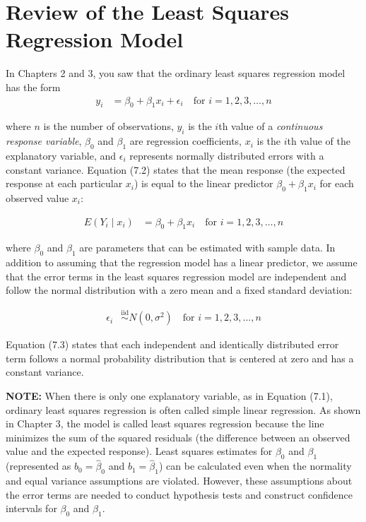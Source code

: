 \documentclass[
]{report}
\begin{document}
\hypertarget{review-of-the-least-squares-regression-model-1}{%
\section{\texorpdfstring{\textbf{Review of the Least Squares Regression Model}}{Review of the Least Squares Regression Model}}\label{review-of-the-least-squares-regression-model-1}}

In Chapters 2 and 3, you saw that the ordinary least squares regression model has the form
\begin{align}
y_i &= \beta_0 + \beta_1 x_i + \epsilon_i
\quad\text{for } i = 1, 2, 3, \dots, n
\tag{7.1}
\end{align}

where \(n\) is the number of observations, \(y_i\) is the \(i\)th value of a \textit{continuous response variable}, \(\beta_0\) and \(\beta_1\) are regression coefficients, \(x_i\) is the \(i\)th value of the explanatory variable, and \(\epsilon_i\) represents normally distributed errors with a constant variance. Equation (7.2) states that the mean response (the expected response at each particular \(x_i\)) is equal to the linear predictor \(\beta_0 + \beta_1 x_i\) for each observed value \(x_i\):

\begin{align}
E(Y_i \mid x_i) &= \beta_0 + \beta_1 x_i 
\quad\text{for } i = 1, 2, 3, \dots, n
\tag{7.2}
\end{align}

where \(\beta_0\) and \(\beta_1\) are parameters that can be estimated with sample data. In addition to assuming that the regression model has a linear predictor, we assume that the error terms in the least squares regression model are independent and follow the normal distribution with a zero mean and a fixed standard deviation:

\begin{align}
\epsilon_i &\overset{\mathrm{iid}}{\sim} N(0, \sigma^2) 
\quad\text{for } i = 1, 2, 3, \dots, n
\tag{7.3}
\end{align}

Equation (7.3) states that each independent and identically distributed error term follows a normal probability
distribution that is centered at zero and has a constant variance.

\large

\textbf{NOTE:}
When there is only one explanatory variable, as in Equation (7.1), ordinary least squares regression is often called simple linear regression. As shown in Chapter 3, the model is called least squares regression because the line minimizes the sum of the squared residuals (the difference between an observed value and the expected response). Least squares estimates for \(\beta_0\) and \(\beta_1\) (represented as \(b_0 = \hat\beta_0\) and \(b_1 = \hat\beta_1\)) can be calculated even when the normality and equal variance assumptions are violated. However, these assumptions about the error terms are needed to conduct hypothesis tests and construct confidence intervals for \(\beta_0\) and \(\beta_1\).
\normalsize
\end{document}
